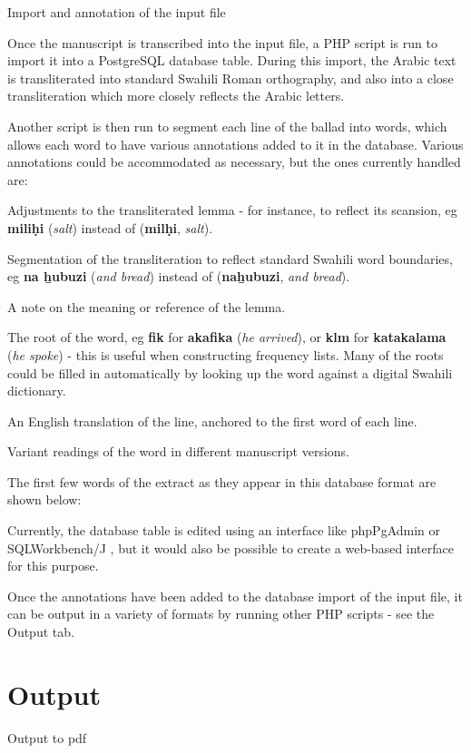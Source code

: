 \documentclass[a4paper,10pt, oneside]{book}
\newcommand\AS[1]{{\citationfont\RLE{#1}}}
\begin{document}
Import and annotation of the input file

Once the manuscript is transcribed into the input file, a PHP script is run to import it into a PostgreSQL database table. During this import, the Arabic text is transliterated into standard Swahili Roman orthography, and also into a close transliteration which more closely reflects the Arabic letters.

Another script is then run to segment each line of the ballad into words, which allows each word to have various annotations added to it in the database. Various annotations could be accommodated as necessary, but the ones currently handled are:

Adjustments to the transliterated lemma - for instance, to reflect its scansion, eg \textbf{miliḥi} (\textit{salt}) instead of \AS{مِلْحِ} (\textbf{milḥi}, \textit{salt}).

Segmentation of the transliteration to reflect standard Swahili word boundaries, eg \textbf{na ẖubuzi} (\textit{and bread}) instead of \AS{نَخُبُوزِ} (\textbf{naẖubuzi}, \textit{and bread}).

A note on the meaning or reference of the lemma.

The root of the word, eg \textbf{fik} for \textbf{akafika} (\textit{he arrived}), or \textbf{klm} for \textbf{katakalama} (\textit{he spoke}) - this is useful when constructing frequency lists. Many of the roots could be filled in automatically by looking up the word against a digital Swahili dictionary.

An English translation of the line, anchored to the first word of each line.

Variant readings of the word in different manuscript versions.

The first few words of the extract as they appear in this database format are shown below:

Currently, the database table is edited using an interface like phpPgAdmin or SQLWorkbench/J , but it would also be possible to create a web-based interface for this purpose.

Once the annotations have been added to the database import of the input file, it can be output in a variety of formats by running other PHP scripts - see the Output tab.

\section{Output}

Output to pdf
\end{document}
